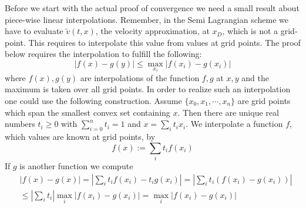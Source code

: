 \documentclass[17pt]{extarticle}
\begin{document}
Before we start with the actual proof of convergence we need a small result about piece-wise linear interpolations. Remember, in the Semi Lagrangian scheme we have to evaluate $\tilde{v}(t,x)$, the velocity approximation, at $x_D$, which is not a grid-point. This requires to interpolate this value from values at grid points. The proof below requires the interpolation to fulfill the following:
\begin{equation} \label{interpolation_req}
	|f(x)-g(y)|\leq \max_{x_i}|f(x_i)-g(x_i)|
\end{equation} 	
where $f(x), g(y)$ are interpolations of the function $f,g$ at $x,y$ and
the maximum is taken over all grid points.
In order to realize such an interpolation one could use the following construction.
Assume $\{x_0, x_1, \cdots, x_n\}$ are grid points which span the smallest convex set containing $x$. Then there are unique real numbers $t_i\geq 0$ with $\sum_{i=0}^{n}t_i=1$ and $x=\sum_i t_i x_i$.
We interpolate a function $f$, which values are known at grid points, by 
$$
f(x):=\sum_{i}t_if(x_i)
$$
If $g$ is another function we compute
\begin{align*}
	&|f(x)-g(x)|=|\sum_i t_if(x_i)-t_ig(x_i)|=|\sum_i t_i(f(x_i)-g(x_i))|\\
	&\leq
	|\sum_i t_i|\max_i|f(x_i)-g(x_i)|=\max_i|f(x_i)-g(x_i)|
\end{align*}
\end{document}
